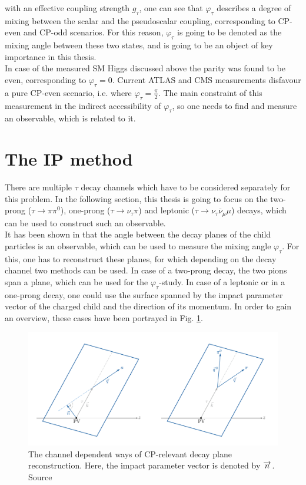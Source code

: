 with an effective coupling strength $g_\tau$, one can see that $\varphi_\tau$ describes a degree of mixing between the scalar and the pseudoscalar coupling, corresponding to CP-even and CP-odd scenarios. For this reason, $\varphi_\tau$ is going to be denoted as the mixing angle between these two states, and is going to be an object of key importance in this thesis.\\
In case of the measured SM Higgs discussed above the parity was found to be even, corresponding to $\varphi_\tau = 0$. Current ATLAS and CMS measurements \parencite{CMS_CP_odd_exclusion,ATLAS_CP_odd_exclusion} disfavour a pure CP-even scenario, i.e. where $\varphi_\tau = \frac{\pi}{2}$. The main constraint of this measurement in the indirect accessibility of $\varphi_\tau$, so one needs to find and measure an observable, which is related to it.
\section{The IP method}
\label{sec:IP_method}
There are multiple $\tau$ decay channels which have to be considered separately for this problem. In the following section, this thesis is going to focus on the two-prong ($\tau \rightarrow \pi\pi^0$), one-prong ($\tau \rightarrow \nu_\tau\pi$) and leptonic ($\tau \rightarrow \nu_\tau\overline{\nu}_\mu \mu$) decays, which can be used to construct such an observable.\\
It has been shown in \parencite{Berge_1prong, Berge_CP_Prospects} that the angle between the decay planes of the child particles is an observable, which can be used to measure the mixing angle $\varphi_\tau$. For this, one has to reconstruct these planes, for which depending on the decay channel two methods can be used. In case of a two-prong decay, the two pions span a plane, which can be used for the $\varphi_\tau$-study. In case of a leptonic or in a one-prong decay, one could use the surface spanned by the impact parameter vector of the charged child and the direction of its momentum. In order to gain an overview, these cases have been portrayed in Fig. \ref{fig:claudiadecayplanes}.
\begin{figure}[h]
	\centering
	\includegraphics[width=0.7\linewidth]{Figures/Claudia_decay_planes}
	\caption{The channel dependent ways of CP-relevant decay plane reconstruction. Here, the impact parameter vector is denoted by $\protect\overrightarrow{n}$. Source \parencite{Claudia_thesis}}
	\label{fig:claudiadecayplanes}
\end{figure}\\
